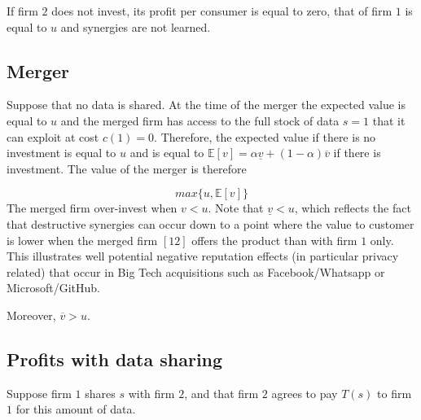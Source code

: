 \documentclass[a4paper,leqno]{article}%
\newcommand{\E}{\mathbb E}
\renewcommand{\a}{\alpha}
\newcommand{\uv}{\underline{v}}
\newcommand{\ov}{\overline{v}}
\begin{document}
If firm $2$ does not invest, its profit per consumer is equal to zero, that of firm $1$ is equal to $u$ and synergies are not learned.


\subsection{Merger}
%
Suppose that no data is shared. At the time of the merger the expected value is equal to $u$ and the merged firm has access to the full stock of data $s=1$ that it can exploit at cost $c(1)=0$. Therefore, the expected value if there is no investment is equal to $u$ and is equal to $\E[v]=\a \uv+(1-\a)\ov$ if there is investment. The value of the merger is therefore
%

$$max\{u,\E[v]\}$$
%
The merged firm over-invest when $v<u$.
%
Note that $\uv<u$, which reflects the fact that destructive synergies can occur down to a point where the value to customer is lower when the merged firm $[12]$ offers the product than with firm $1$ only. This illustrates well potential negative reputation effects (in particular privacy related) that occur in Big Tech acquisitions such as Facebook/Whatsapp or Microsoft/GitHub.

Moreover, $\ov>u$.

\subsection{Profits with data sharing}

Suppose firm $1$ shares $s$ with firm $2$, and that firm $2$ agrees to pay $T(s)$ to firm $1$ for this amount of data. 
\end{document}
